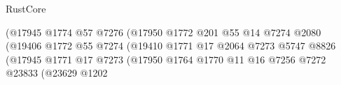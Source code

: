 \begin{lexlean}{RustCore}
\begin{coremodule}
                                                            (@17945
                                                              @1774
                                                              @57
                                                              @7276
                                                              (@17950
                                                                @1772
                                                                @201
                                                                @55
                                                                @14
                                                                @7274
                                                                @2080
                                                                (@19406
                                                                  @1772
                                                                  @55
                                                                  @7274
                                                                  (@19410
                                                                    @1771
                                                                    @17
                                                                    @2064
                                                                    @7273
                                                                    @5747
                                                                    @8826
                                                                    (@17945
                                                                      @1771
                                                                      @17
                                                                      @7273
                                                                      (@17950
                                                                        @1764
                                                                        @1770
                                                                        @11
                                                                        @16
                                                                        @7256
                                                                        @7272
                                                                        @23833
                                                                        (@23629
                                                                          @1202

\end{coremodule}
\end{lexlean}
